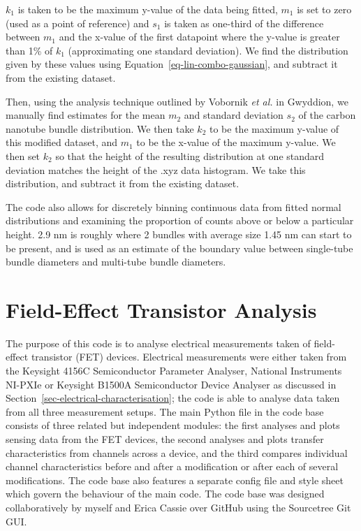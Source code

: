 \documentclass[
  a4paper,
]{scrbook}
\begin{document}
\(k_1\) is taken to be the maximum y-value of the data being fitted,
\(m_1\) is set to zero (used as a point of reference) and \(s_1\) is
taken as one-third of the difference between \(m_1\) and the x-value of
the first datapoint where the y-value is greater than 1\% of \(k_1\)
(approximating one standard deviation). We find the distribution given
by these values using Equation~\ref{eq-lin-combo-gaussian}, and subtract
it from the existing dataset.

Then, using the analysis technique outlined by Vobornik \emph{et al.}
\autocite{Vobornik2023} in Gwyddion, we manually find estimates for the
mean \(m_2\) and standard deviation \(s_2\) of the carbon nanotube
bundle distribution. We then take \(k_2\) to be the maximum y-value of
this modified dataset, and \(m_1\) to be the x-value of the maximum
y-value. We then set \(k_2\) so that the height of the resulting
distribution at one standard deviation matches the height of the .xyz
data histogram. We take this distribution, and subtract it from the
existing dataset.

The code also allows for discretely binning continuous data from fitted
normal distributions and examining the proportion of counts above or
below a particular height. 2.9 nm is roughly where 2 bundles with
average size 1.45 nm can start to be present, and is used as an estimate
of the boundary value between single-tube bundle diameters and
multi-tube bundle diameters.

\hypertarget{sec-field-effect-transistor-analysis}{%
\section{Field-Effect Transistor
Analysis}\label{sec-field-effect-transistor-analysis}}

The purpose of this code is to analyse electrical measurements taken of
field-effect transistor (FET) devices. Electrical measurements were
either taken from the Keysight 4156C Semiconductor Parameter Analyser,
National Instruments NI-PXIe or Keysight B1500A Semiconductor Device
Analyser as discussed in Section~\ref{sec-electrical-characterisation};
the code is able to analyse data taken from all three measurement
setups. The main Python file in the code base consists of three related
but independent modules: the first analyses and plots sensing data from
the FET devices, the second analyses and plots transfer characteristics
from channels across a device, and the third compares individual channel
characteristics before and after a modification or after each of several
modifications. The code base also features a separate config file and
style sheet which govern the behaviour of the main code. The code base
was designed collaboratively by myself and Erica Cassie over GitHub
using the Sourcetree Git GUI.
\end{document}
